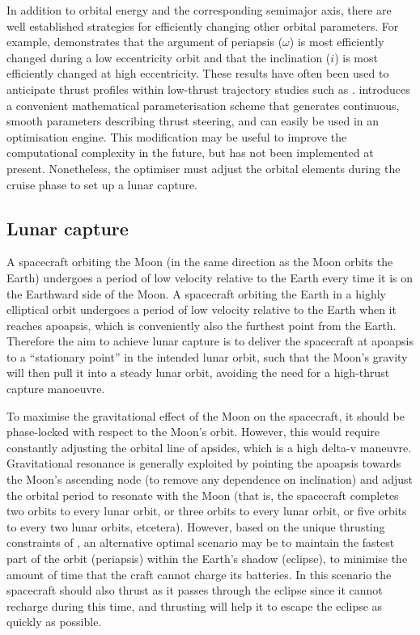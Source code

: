 In addition to orbital energy and the corresponding semimajor axis, there are well established strategies for efficiently changing other orbital parameters. For example, \textcite{Edelbaum1964} demonstrates that the argument of periapsis ($\omega$) is most efficiently changed during a low eccentricity orbit and that the inclination ($i$) is most efficiently changed at high eccentricity. These results have often been used to anticipate thrust profiles within low-thrust trajectory studies such as \textcite{Dachwald2007}. \textcite{Gao2008} introduces a convenient mathematical parameterisation scheme that generates continuous, smooth parameters describing thrust steering, and can easily be used in an optimisation engine. This modification may be useful to improve the computational complexity in the future, but has not been implemented at present. Nonetheless, the optimiser must adjust the orbital elements during the cruise phase to set up a lunar capture.


\subsection{Lunar capture} \label{sub:Capture}

A spacecraft orbiting the Moon (in the same direction as the Moon orbits the Earth) undergoes a period of low velocity relative to the Earth every time it is on the Earthward side of the Moon. A spacecraft orbiting the Earth in a highly elliptical orbit undergoes a period of low velocity relative to the Earth when it reaches apoapsis, which is conveniently also the furthest point from the Earth. Therefore the aim to achieve lunar capture is to deliver the spacecraft at apoapsis to a \enquote{stationary point} in the intended lunar orbit, such that the Moon's gravity will then pull it into a steady lunar orbit, avoiding the need for a high-thrust capture manoeuvre.

To maximise the gravitational effect of the Moon on the spacecraft, it should be phase-locked with respect to the Moon's orbit. However, this would require constantly adjusting the orbital line of apsides, which is a high delta-v maneuvre. Gravitational resonance is generally exploited by pointing the apoapsis towards the Moon's ascending node (to remove any dependence on inclination) and adjust the orbital period to resonate with the Moon (that is, the spacecraft completes two orbits to every lunar orbit, or three orbits to every lunar orbit, or five orbits to every two lunar orbits, etcetera). However, based on the unique thrusting constraints of \BW, an alternative optimal scenario may be to maintain the fastest part of the orbit (periapsis) within the Earth's shadow (eclipse), to minimise the amount of time that the craft cannot charge its batteries. In this scenario the spacecraft should also thrust as it passes through the eclipse since it cannot recharge during this time, and thrusting will help it to escape the eclipse as quickly as possible. 

